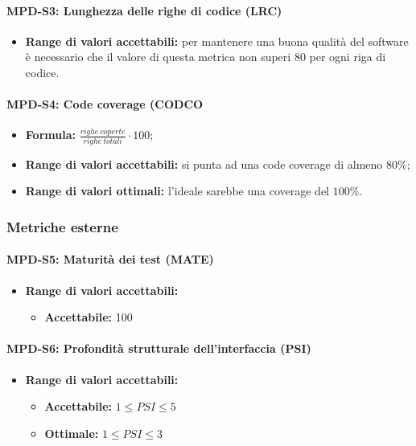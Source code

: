 \paragraph{MPD-S3: Lunghezza delle righe di codice (LRC)}
\begin{itemize}

    \item \textbf{Range di valori accettabili:} per mantenere una buona qualità del software è necessario che il valore di questa metrica non superi
    80 per ogni riga di codice.
\end{itemize}

\paragraph{MPD-S4: Code coverage (CODCO}
\begin{itemize}
    \item \textbf{Formula:} $\frac{righe \ coperte}{righe \ totali} \cdot 100$;
    \item \textbf{Range di valori accettabili:} si punta ad una code coverage di almeno $80\%$;
    \item \textbf{Range di valori ottimali:} l'ideale sarebbe una coverage del $100\%$.
\end{itemize}


\subsubsection{Metriche esterne}

\paragraph{MPD-S5: Maturità dei test (MATE)}

\begin{itemize}
    \item \textbf{Range di valori accettabili:}
    \begin{itemize}
        \item \textbf{Accettabile:} 100%
       
    \end{itemize}
\end{itemize}


\paragraph{MPD-S6: Profondità strutturale dell'interfaccia (PSI)}

\begin{itemize}
    \item \textbf{Range di valori accettabili:} 
     \begin{itemize}
        \item \textbf{Accettabile:} $1 \leq PSI \leq 5$ 
        \item \textbf{Ottimale:} $1 \leq PSI \leq 3$
        
    \end{itemize}
\end{itemize}

